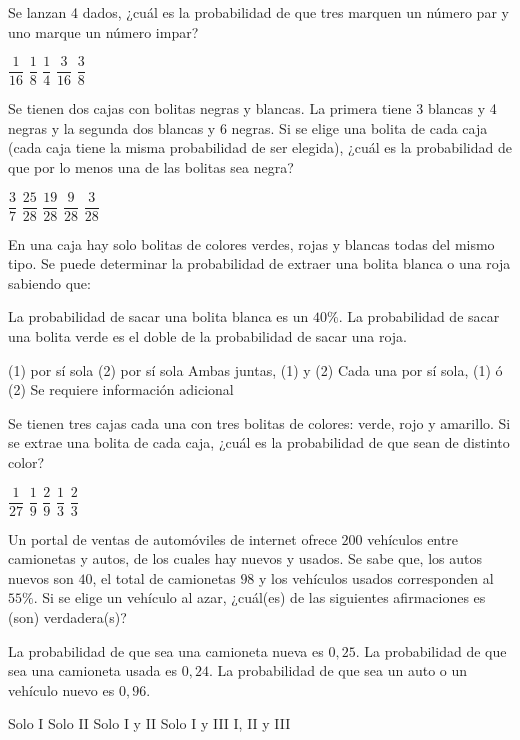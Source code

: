 \documentclass[sin nombre]{srs2}
\begin{document}
\begin{preguntas}
\pregunta Se lanzan 4 dados, ¿cuál es la probabilidad de que tres marquen un número par y uno marque un número impar?
\begin{alternativas}
\alternativa $\dfrac{1}{16}$
\alternativa $\dfrac{1}{8}$
\alternativa $\dfrac{1}{4}$
\alternativa $\dfrac{3}{16}$
\alternativa $\dfrac{3}{8}$
\end{alternativas}

\pregunta Se tienen dos cajas con bolitas negras y blancas. La primera tiene 3 blancas y 4 negras y la segunda dos blancas y 6 negras. Si se elige una bolita de cada caja (cada caja tiene la misma probabilidad de ser elegida), ¿cuál es la probabilidad de que por lo menos una de las bolitas sea negra?
\begin{alternativas}
\alternativa $\dfrac{3}{7}$
\alternativa $\dfrac{25}{28}$
\alternativa $\dfrac{19}{28}$
\alternativa $\dfrac{9}{28}$
\alternativa $\dfrac{3}{28}$
\end{alternativas}

\pregunta En una caja hay solo bolitas de colores verdes, rojas y blancas todas del mismo tipo. Se puede determinar la probabilidad de extraer una bolita blanca o una roja sabiendo que:
\begin{opciones*}
\opcion La probabilidad de sacar una bolita blanca es un $40\%$.
\opcion La probabilidad de sacar una bolita verde es el doble de la probabilidad de sacar una roja.
\end{opciones*}
\begin{alternativas}
\alternativa (1) por sí sola
\alternativa (2) por sí sola
\alternativa Ambas juntas, (1) y (2)
\alternativa Cada una por sí sola, (1) ó (2)
\alternativa Se requiere información adicional
\end{alternativas}

\pregunta Se tienen tres cajas cada una con tres bolitas de colores: verde, rojo y amarillo. Si se extrae una bolita de cada caja, ¿cuál es la probabilidad de que sean de distinto color?
\begin{alternativas}
\alternativa $\dfrac{1}{27}$
\alternativa $\dfrac{1}{9}$
\alternativa $\dfrac{2}{9}$
\alternativa $\dfrac{1}{3}$
\alternativa $\dfrac{2}{3}$
\end{alternativas}

\pregunta Un portal de ventas de automóviles de internet ofrece $200$ vehículos entre camionetas y autos, de los cuales hay nuevos y usados. Se sabe que, los autos nuevos son $40$, el total de camionetas $98$ y los vehículos usados corresponden al $55\%$. Si se elige un vehículo al azar, ¿cuál(es) de las siguientes afirmaciones es (son) verdadera(s)?
\begin{opciones}
\opcion La probabilidad de que sea una camioneta nueva es $0,25$.
\opcion La probabilidad de que sea una camioneta usada es $0,24$.
\opcion La probabilidad de que sea un auto o un vehículo nuevo es $0,96$.
\end{opciones}
\begin{alternativas}
\alternativa Solo I
\alternativa Solo II
\alternativa Solo I y II
\alternativa Solo I y III
\alternativa I, II y III
\end{alternativas}


\end{preguntas}
\end{document}
